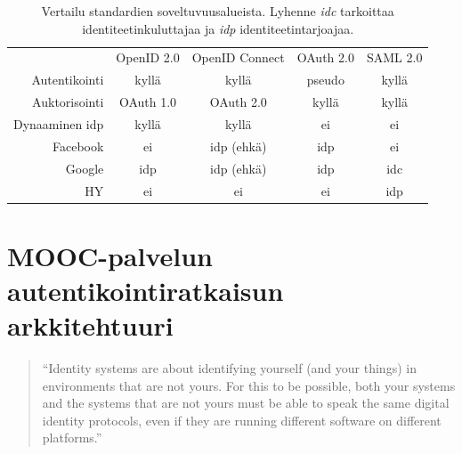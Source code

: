 \documentclass[finnish,gradu]{tktltiki}
\begin{document}
  \begin{table}
    \begin{tabular}{r|c|c|c|c|}
    \multicolumn{1}{r}{}
     & \multicolumn{1}{c}{OpenID 2.0}
     & \multicolumn{1}{c}{OpenID Connect}
     & \multicolumn{1}{c}{OAuth 2.0}
     & \multicolumn{1}{c}{SAML 2.0} \\
    \cline{2-5}
    Autentikointi  & kyllä       & kyllä       & pseudo       & kyllä \\
    \cline{1-5}
    Auktorisointi  & OAuth 1.0   & OAuth 2.0   & kyllä        & kyllä \\
    \cline{1-5}
    Dynaaminen idp & kyllä       & kyllä       & ei           & ei \\
    \cline{1-5}
    Facebook       & ei          & idp (ehkä)  & idp          & ei \\
    \cline{1-5}
    Google         & idp         & idp (ehkä)  & idp          & idc \\
    \cline{1-5}
    HY             & ei          & ei          & ei           & idp \\
    \cline{2-5}
    \end{tabular}

    \label{tab:sso_soveltuvuudet}
    \caption{Vertailu standardien soveltuvuusalueista. Lyhenne \emph{idc} tarkoittaa identiteetinkuluttajaa ja \emph{idp} identiteetintarjoajaa.}

  \end{table}







\newpage
\section{MOOC-palvelun autentikointiratkaisun arkkitehtuuri} %
\label{sec:mooc_palvelun_autentikointiratkaisun_arkkitehtuuri}

  \begin{quote}
    ``Identity systems are about identifying yourself (and your things) in environments that are not yours.
    For this to be possible, both your systems and the systems that are not yours
    must be able to speak the same digital identity protocols,
    even if they are running different software on different platforms.''~\cite{cameron_id_arch_2006}
  \end{quote}
\end{document}
